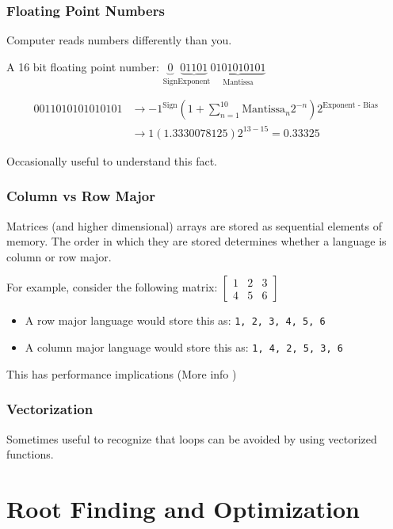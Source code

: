 \documentclass[10pt]{beamer}
\begin{document}
\begin{frame} \frametitle{Floating Point Numbers}
  Computer reads numbers differently than you.

  A 16 bit floating point number: $\underbrace{0}_{\text{Sign}} \underbrace{01101}_{\text{Exponent}} \underbrace{0101010101}_{\text{Mantissa}}$

  \begin{align*}
    0 01101 0101010101 &\rightarrow -1^{\text{Sign}} \left(1 + \sum_{n=1}^{10} \text{Mantissa}_n 2^{-n} \right) 2^{\text{Exponent - Bias}} \\
                       &\rightarrow 1 (1.3330078125) 2^{13 - 15} = 0.33325
  \end{align*}

  Occasionally useful to understand this fact.
\end{frame}

\begin{frame}[label=ColRowMajor] \frametitle{Column vs Row Major}

  Matrices (and higher dimensional) arrays are stored as sequential elements of memory. The order in which they are stored determines whether a language is column or row major.

  For example, consider the following matrix: $\begin{bmatrix} 1 & 2 & 3 \\ 4 & 5 & 6 \end{bmatrix}$
  \begin{itemize}
    \item A row major language would store this as: \lstinline{1, 2, 3, 4, 5, 6}
    \item A column major language would store this as: \lstinline{1, 4, 2, 5, 3, 6}
  \end{itemize}

  This has performance implications (More info \hyperlink{ColRowMajor_Supp}{})
\end{frame}

\begin{frame} \frametitle{Vectorization}

  Sometimes useful to recognize that loops can be avoided by using vectorized functions.

\end{frame}


\section{Root Finding and Optimization}
\end{document}
